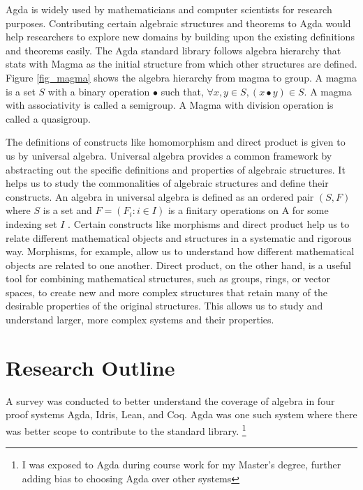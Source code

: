 Agda is widely used by mathematicians and computer scientists for research
purposes. Contributing certain algebraic structures and theorems to Agda would
help researchers to explore new domains by building upon the existing
definitions and theorems easily. The Agda standard library follows algebra
hierarchy that stats with Magma as the initial structure from which other
structures are defined. Figure \ref{fig_magma} shows the algebra hierarchy from
magma to group. A magma is a set $S$ with a binary operation $∙$ such that,
$\forall x,y \in S, (x ∙ y) \in S$. A magma with associativity is called a
semigroup. A Magma with division operation is called a quasigroup.

The definitions of constructs like homomorphism and direct product is given to
us by universal algebra. Universal algebra provides a common framework by
abstracting out the specific definitions and properties of algebraic structures.
It helps us to study the commonalities of algebraic structures and define their
constructs. An algebra in universal algebra is defined as an ordered pair
$(S,F)$ where $S$ is a set and $F = (F_i:i\in I)$ is a finitary operations on A
for some indexing set $I$ \cite{sannella2012foundations}. Certain constructs
like morphisms and direct product help us to relate different mathematical
objects and structures in a systematic and rigorous way. Morphisms, for example,
allow us to understand how different mathematical objects are related to one
another. Direct product, on the other hand, is a useful tool for combining
mathematical structures, such as groups, rings, or vector spaces, to create new
and more complex structures that retain many of the desirable properties of the
original structures. This allows us to study and understand larger, more complex
systems and their properties.

\section{Research Outline}
 A survey
was conducted to better understand the coverage of algebra in four proof systems
Agda, Idris, Lean, and Coq. Agda was one such system where there was better
scope to contribute to the standard library. \footnote{I was exposed to Agda
during course work for my Master's degree, further adding bias to choosing Agda
over other systems} 

